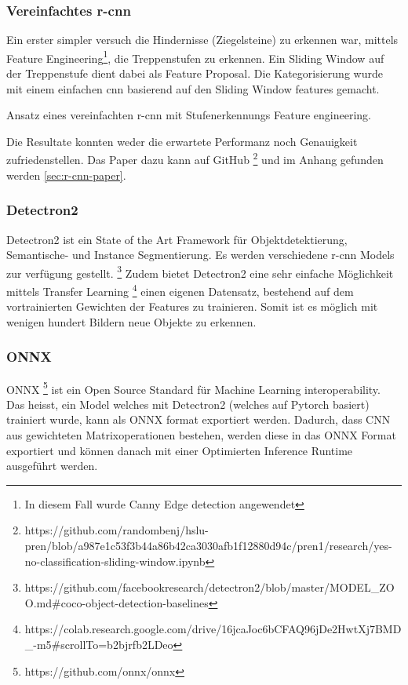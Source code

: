 \subsubsection{Vereinfachtes \acrshort{r-cnn}}

Ein erster simpler versuch die Hindernisse (Ziegelsteine) zu erkennen war, mittels Feature Engineering\footnote{
In diesem Fall wurde Canny Edge detection \cite{canny-edge-detection} angewendet}, die Treppenstufen zu
erkennen. Ein Sliding Window auf der Treppenstufe dient dabei als Feature Proposal.
Die Kategorisierung wurde mit einem einfachen \acrshort{cnn} basierend auf den Sliding Window features 
gemacht.

{
Ansatz eines vereinfachten \acrshort{r-cnn} mit Stufenerkennungs Feature engineering.
}

Die Resultate konnten weder die erwartete Performanz noch Genauigkeit zufriedenstellen.
Das Paper dazu kann auf GitHub \footnote{
https://github.com/randombenj/hslu-pren/blob/a987e1c53f3b44a86b42ca3030afb1f12880d94c/pren1/research/yes-no-classification-sliding-window.ipynb} und im Anhang gefunden werden \ref{sec:r-cnn-paper}.


\subsubsection{Detectron2}

Detectron2 \cite{wu2019detectron2} ist ein State of the Art Framework für Objektdetektierung, Semantische- und Instance Segmentierung.
Es werden verschiedene \acrshort{r-cnn} Models zur verfügung gestellt. \footnote{
https://github.com/facebookresearch/detectron2/blob/master/MODEL\_ZOO.md\#coco-object-detection-baselines
}
Zudem bietet Detectron2 eine sehr einfache Möglichkeit mittels Transfer Learning \footnote{https://colab.research.google.com/drive/16jcaJoc6bCFAQ96jDe2HwtXj7BMD_-m5\#scrollTo=b2bjrfb2LDeo}
einen eigenen Datensatz, bestehend auf dem vortrainierten Gewichten der Features zu trainieren.
Somit ist es möglich mit wenigen hundert Bildern neue Objekte zu erkennen.

\subsubsection{ONNX}

ONNX \footnote{https://github.com/onnx/onnx} ist ein Open Source Standard für Machine Learning
interoperability. Das heisst, ein Model welches mit Detectron2 (welches auf Pytorch basiert) trainiert
wurde, kann als ONNX format exportiert werden.
Dadurch, dass \acrshort{CNN} aus gewichteten Matrixoperationen bestehen, werden diese in das ONNX Format
exportiert und können danach mit einer Optimierten Inference Runtime ausgeführt werden.

